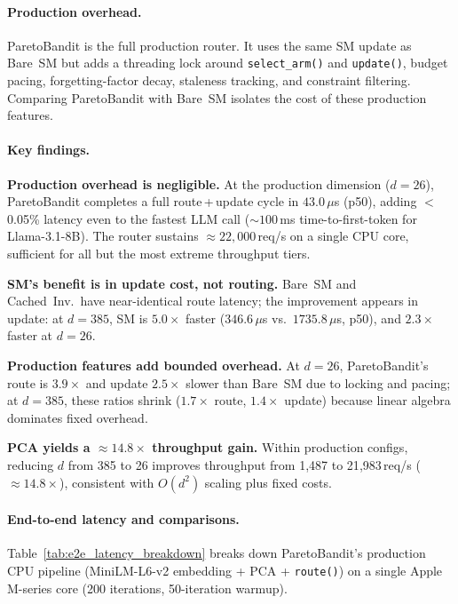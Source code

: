 \paragraph{Production overhead.}
ParetoBandit is the full production router.  It uses the same SM
update as Bare~SM but adds a threading lock around
\texttt{select\_arm()} and \texttt{update()}, budget pacing,
forgetting-factor decay, staleness tracking, and constraint filtering.
Comparing ParetoBandit with Bare~SM isolates the cost of these
production features.

\paragraph{Key findings.}

\textbf{Production overhead is negligible.}
At the production dimension ($d{=}26$), ParetoBandit completes a full
route\,+\,update cycle in $43.0\,\mu$s (p50), adding $<$\,0.05\%
latency even to the fastest LLM call (${\sim}100$\,ms
time-to-first-token for Llama-3.1-8B).
The router sustains ${\approx}22{,}000$\,req/s on a single CPU
core, sufficient for all but the most extreme throughput tiers.

\textbf{SM's benefit is in update cost, not routing.}
Bare~SM and Cached~Inv.\ have near-identical route latency; the improvement
appears in update: at $d{=}385$, SM is $5.0{\times}$ faster
($346.6\,\mu$s vs.\ $1735.8\,\mu$s, p50), and $2.3{\times}$ faster
at $d{=}26$.

\textbf{Production features add bounded overhead.}
At $d{=}26$, ParetoBandit's route is $3.9{\times}$ and update
$2.5{\times}$ slower than Bare~SM due to locking and pacing; at
$d{=}385$, these ratios shrink ($1.7{\times}$ route,
$1.4{\times}$ update) because linear algebra dominates fixed overhead.

\textbf{PCA yields a ${\approx}14.8{\times}$ throughput gain.}
Within production configs, reducing $d$ from 385 to 26 improves
throughput from 1{,}487 to 21{,}983\,req/s (${\approx}14.8{\times}$),
consistent with $O(d^2)$ scaling plus fixed costs.

\paragraph{End-to-end latency and comparisons.}
Table~\ref{tab:e2e_latency_breakdown} breaks down ParetoBandit's
production CPU pipeline (MiniLM-L6-v2 embedding + PCA +
\texttt{route()}) on a single Apple M-series core (200 iterations,
50-iteration warmup).

